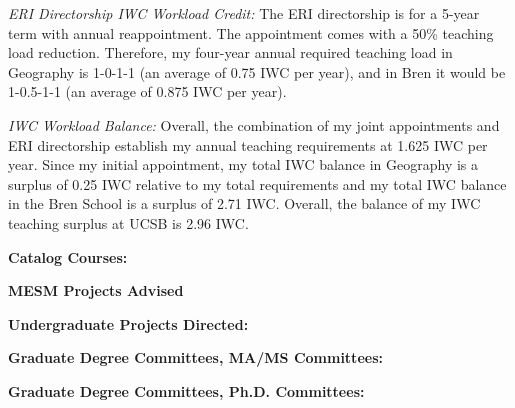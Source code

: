 \documentclass[10pt]{article}
\begin{document}
\begin{enumerate}
{\item {\em ERI Directorship IWC Workload Credit:} The ERI directorship is for a 5-year term with annual reappointment.  The appointment comes with a 50\% teaching load reduction. Therefore, my four-year annual required teaching load in Geography is 1-0-1-1 (an average of 0.75 IWC per year), and in Bren it would be 1-0.5-1-1 (an average of 0.875 IWC per year). 

\item {\em IWC Workload Balance:} Overall, the combination of my joint appointments and ERI directorship establish my annual teaching requirements at 1.625 IWC per year. Since my initial appointment, my total IWC balance in Geography is a surplus of 0.25 IWC relative to my total requirements and my total IWC balance in the Bren School is a surplus of 2.71 IWC.  Overall, the balance of my IWC teaching surplus at UCSB is 2.96 IWC.
}
\end{enumerate}

\vspace{0.5cm}
{\bf Catalog Courses:}


\vspace{0.5cm}
{\bf MESM Projects Advised}


\vspace{1cm}
{\bf Undergraduate Projects Directed:}


\vspace{1cm}
{\bf Graduate Degree Committees, MA/MS Committees:}
\vspace{0.25cm}



\vspace{0.5cm}
{\bf Graduate Degree Committees, Ph.D. Committees:}
\vspace{0.25cm}

\end{document}
